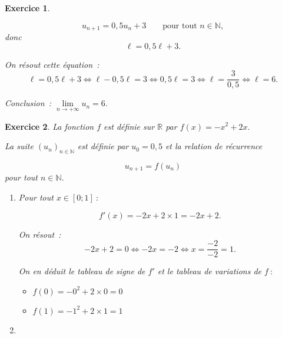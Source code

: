 \documentclass[10pt]{article}
\newtheorem{exo}{Exercice}
\begin{document}
\begin{exo}
\begin{enumerate}
\[u_{n+1}=0,5u_n+3\qquad\text{pour tout }n\in\mathbb{N},\] donc
\[\ell=0,5\ell+3.\]

On résout cette équation~:
\[\ell=0,5\ell+3\iff \ell-0,5\ell=3\iff 0,5\ell=3\iff\ell=\frac{3}{0,5}\iff \ell=6.\]

Conclusion~: $\lim\limits_{n\to +\infty}u_n=6.$

\end{enumerate}
 
 \end{exo}
 
 \begin{exo}

La fonction $f$ est définie sur $\mathbb{R}$ par $f(x)=-x^2+2x.$


La suite $(u_n)_{n\in\mathbb{N}}$ est définie par $u_0=0,5$ et la relation de récurrence

\[u_{n+1}=f\left(u_n\right)\] pour tout $n\in\mathbb{N}.$

\begin{enumerate}
\item Pour tout $x\in\left[0;1\right]~:$

\[f'(x)=-2x+2\times 1=-2x+2.\]

On résout~:
\[-2x+2=0\iff -2x=-2\iff x=\frac{-2}{-2}=1.\]


On en déduit le tableau de signe de $f'$ et le tableau de variations de $f~:$


\medskip

\setlength{\columnseprule}{1pt}

\begin{multicols}{2}

\begin{center}
\end{center}

\columnbreak


\begin{itemize}
\item[\textbullet] $f(0)=-0^2+2\times 0=0$
\item[\textbullet] $f(1)=-1^2+2\times 1=1$
\end{itemize}



\end{multicols}


\item 


\end{enumerate}
\end{exo}
\end{document}
